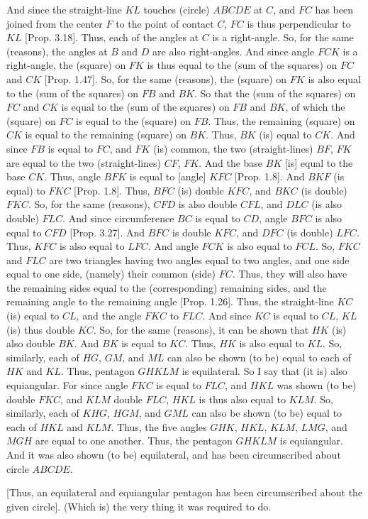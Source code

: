 \begin{Parallel}{}{}
{And since the straight-line $KL$ touches (circle) $ABCDE$ at $C$, and $FC$ has been
joined from the center $F$ to the point of contact $C$, $FC$ is thus perpendicular 
to $KL$ [Prop. 3.18]. Thus, each of the angles
at $C$ is a right-angle. So, for the same (reasons), the angles at $B$ and $D$
are also right-angles. And since angle $FCK$ is a right-angle, the (square)
on $FK$ is thus equal to the (sum of the squares) on $FC$ and $CK$ [Prop. 1.47]. So, for the same (reasons), 
the (square) on $FK$ is also equal to the (sum of the squares) on $FB$ and $BK$.
So that the (sum of the squares) on $FC$ and $CK$ is equal to the (sum of the squares) on $FB$ and $BK$, of which the (square) on $FC$ is equal to the
(square) on $FB$. Thus, the remaining (square) on $CK$ is equal to
the remaining (square) on $BK$. Thus, $BK$ (is) equal to $CK$. And since
$FB$ is equal to $FC$, and $FK$ (is) common, the two (straight-lines)
$BF$, $FK$ are equal to the two (straight-lines) $CF$, $FK$. And the base $BK$
[is] equal to the base $CK$. Thus, angle $BFK$ is equal to [angle] $KFC$ 
[Prop. 1.8]. And $BKF$ (is equal) to $FKC$ [Prop. 1.8].
Thus, $BFC$ (is) double $KFC$,
and $BKC$ (is double) $FKC$. So, for the same (reasons), $CFD$ is also double
$CFL$, and $DLC$ (is also double) $FLC$. And since circumference $BC$
is equal  to $CD$, angle $BFC$ is also  equal  to $CFD$ [Prop. 3.27]. And $BFC$ is double $KFC$,
and $DFC$ (is double) $LFC$.  Thus, $KFC$ is also equal to $LFC$. 
And
angle $FCK$ is also equal to $FCL$. So, $FKC$ and $FLC$ are two triangles
having two angles equal to two angles, and one side equal to one side,
(namely) their common (side) $FC$. Thus, they will also have the
remaining sides equal to the (corresponding) remaining sides, and
the remaining angle to the remaining angle [Prop. 1.26]. Thus, the straight-line $KC$
(is) equal to $CL$, and the angle $FKC$ to $FLC$. And since $KC$ is
equal to $CL$, $KL$ (is) thus double $KC$. So, for the
same (reasons), it can be shown that $HK$ (is) also double $BK$. And
$BK$ is equal to $KC$. Thus, $HK$ is also equal to $KL$. So, similarly,  each of $HG$, $GM$, and $ML$ can also be shown (to be) equal to each of
$HK$ and $KL$. Thus, pentagon $GHKLM$ is equilateral. So I say that
(it is) also equiangular. For since angle $FKC$ is equal to $FLC$, 
and $HKL$ was shown (to be) double $FKC$, and $KLM$ double 
$FLC$, $HKL$ is thus also equal to $KLM$. So, similarly, each of $KHG$, $HGM$, and $GML$ can also be shown (to be) equal to each of
$HKL$ and $KLM$. Thus, the five angles $GHK$, $HKL$, $KLM$, $LMG$, and
$MGH$ are equal to one another. Thus, the pentagon $GHKLM$ is
equiangular. And it was also shown (to be) equilateral, and has been circumscribed 
about circle $ABCDE$.

\mbox{[}Thus, an equilateral and equiangular pentagon has been circumscribed
about the given circle]. (Which is) the very thing it was required to do. }
\end{Parallel}


